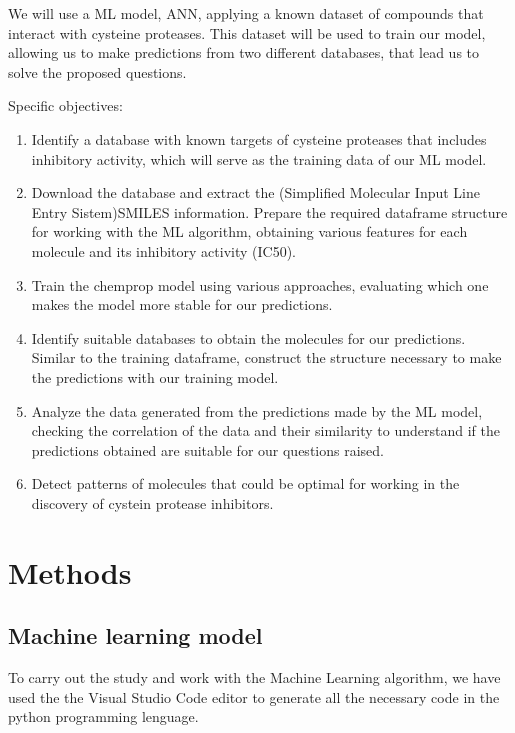 \documentclass[final,times,twocolumn,article]{elsarticle}
\begin{document}

We will use a ML model, ANN, applying a known dataset of compounds that interact with cysteine proteases. This dataset will be used to train our model, allowing us to make predictions from two different databases, that lead us to solve the proposed questions.

Specific objectives:

\begin{enumerate}
    \item Identify a database with known targets of cysteine proteases that includes inhibitory activity, which will serve as the training data of our ML model. 
    \item Download the database and extract the (Simplified Molecular Input Line Entry Sistem)SMILES information. Prepare the required dataframe structure for working with the ML algorithm, obtaining various features for each molecule and its inhibitory activity (IC50).
    \item Train the chemprop model using various approaches, evaluating which one makes the model more stable for our predictions. 
    \item Identify suitable databases to obtain the molecules for our predictions. Similar to the training dataframe, construct the structure necessary to make the predictions with our training model. 
    \item Analyze the data generated from the predictions made by the ML model, checking the correlation of the data and their similarity to understand if the predictions obtained are suitable for our questions raised. 
    \item Detect patterns of molecules that could be optimal for working in the discovery of cystein protease inhibitors. 
\end{enumerate}

\section{Methods}

\subsection{Machine learning model}

To carry out the study and work with the Machine Learning algorithm, we have used the the Visual Studio Code editor to generate all the necessary code in the python programming lenguage. 
\end{document}
